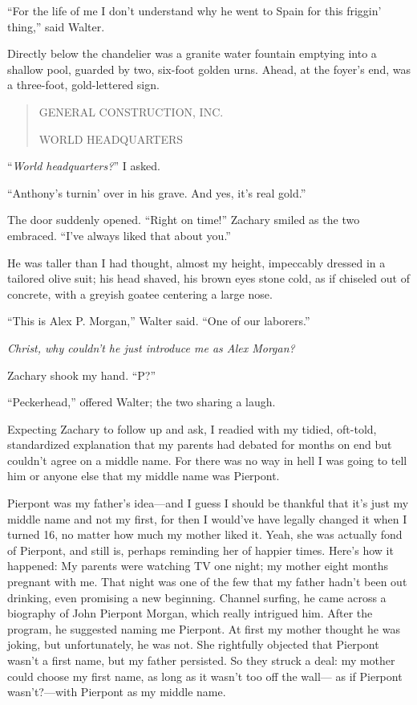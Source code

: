 ``For the life of me I don't understand why he went to Spain for this
friggin' thing,'' said Walter.

Directly below the chandelier was a granite water fountain emptying into
a shallow pool, guarded by two, six-foot golden urns. Ahead, at the
foyer's end, was a three-foot, gold-lettered sign.

\begin{quote}
GENERAL CONSTRUCTION, INC.

WORLD HEADQUARTERS
\end{quote}

\noindent ``\emph{World headquarters?}'' I asked.

``Anthony's turnin' over in his grave. And yes, it's real gold.''

The door suddenly opened. ``Right on time!'' Zachary smiled as the two
embraced. ``I've always liked that about you.''

He was taller than I had thought, almost my height, impeccably dressed
in a tailored olive suit; his head shaved, his brown eyes stone cold, as
if chiseled out of concrete, with a greyish goatee centering a large
nose.

``This is Alex P. Morgan,'' Walter said. ``One of our laborers.''

\emph{Christ, why couldn't he just introduce me as Alex Morgan?}

Zachary shook my hand. ``P?''

``Peckerhead,'' offered Walter; the two sharing a laugh.

Expecting Zachary to follow up and ask, I readied with my tidied,
oft-told, standardized explanation that my parents had debated for
months on end but couldn't agree on a middle name. For there was no way
in hell I was going to tell him or anyone else that my middle name was
Pierpont.

Pierpont was my father's idea---and I guess I should be thankful that
it's just my middle name and not my first, for then I would've have
legally changed it when I turned 16, no matter how much my mother liked
it. Yeah, she was actually fond of Pierpont, and still is, perhaps
reminding her of happier times. Here's how it happened: My parents were
watching TV one night; my mother eight months pregnant with me. That
night was one of the few that my father hadn't been out drinking, even
promising a new beginning. Channel surfing, he came across a biography
of John Pierpont Morgan, which really intrigued him. After the program,
he suggested naming me Pierpont. At first my mother thought he was
joking, but unfortunately, he was not. She rightfully objected that
Pierpont wasn't a first name, but my father persisted. So they struck a
deal: my mother could choose my first name, as long as it wasn't too off
the wall--- as if Pierpont wasn't?---with Pierpont as my middle name.

